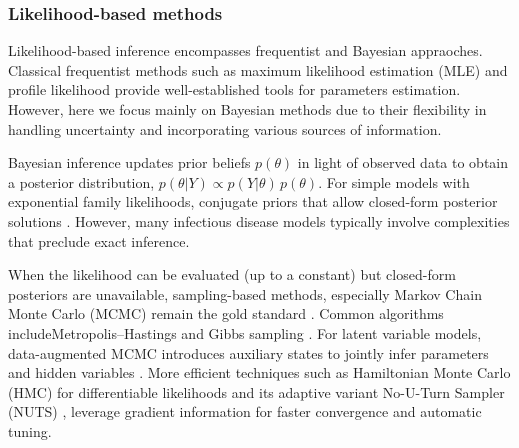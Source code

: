\documentclass{article}
\begin{document}





\subsubsection{Likelihood-based methods}
Likelihood-based inference encompasses frequentist and Bayesian appraoches. Classical frequentist methods such as maximum likelihood estimation (MLE)\citep{myung2003tutorial, baltazar2024maximum} and profile likelihood \citep{tonsing2018profile, plank2024structured} provide well-established tools for parameters estimation. However, here we focus mainly on Bayesian methods due to their flexibility in handling uncertainty and incorporating various sources of information.

Bayesian inference updates prior beliefs $ p(\theta)$ in light of observed data to obtain a posterior distribution, $p(\theta | Y) \propto p(Y|\theta) \,p(\theta)$. For simple models with exponential family likelihoods, conjugate priors that allow closed-form posterior solutions \citep{gelman1995bayesian,  cori2013new}. However, many infectious disease models typically involve complexities that preclude exact inference.

When the likelihood can be evaluated (up to a constant) but closed-form posteriors are unavailable, sampling-based methods, especially Markov Chain Monte Carlo (MCMC) remain the gold standard \citep{gilks1995markov, lekone2006statistical}. Common algorithms includeMetropolis–Hastings \citep{hastings1970monte} and Gibbs sampling \citep{geman1984stochastic}. For latent variable models, data-augmented MCMC introduces auxiliary states to jointly infer parameters and hidden variables \citep{o1999bayesian}. More efficient techniques such as Hamiltonian Monte Carlo (HMC) for differentiable likelihoods \citep{duane1987hybrid} and its adaptive variant No-U-Turn Sampler (NUTS) \citep{hoffman2014no, andrade2020evaluation}, leverage gradient information for faster convergence and automatic tuning. 
\end{document}
